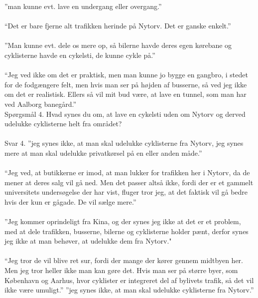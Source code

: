 \begin{appendics}
  ”man kunne evt. lave en undergang eller overgang.”
\\\\
  “Det er bare fjerne alt trafikken herinde på Nytorv. Det er ganske enkelt.”
\\\\
  ”Man kunne evt. dele os mere op, så bilerne havde deres egen kørebane og cyklisterne havde en cykelsti, de kunne cykle på.”
\\\\
  “Jeg ved ikke om det er praktisk, men man kunne jo bygge en gangbro, i stedet for de fodgængere felt, men hvis man ser på højden af busserne, så ved jeg ikke om det er realistisk. Ellers så vil mit bud være, at lave en tunnel, som man har ved Aalborg banegård.”
\\
Spørgsmål 4.
Hvad synes du om, at lave en cykelsti uden om Nytorv og derved udelukke cyklisterne helt fra området?
\\\\
  Svar 4.
  ”jeg synes ikke, at man skal udelukke cyklisterne fra Nytorv, jeg synes mere at man skal udelukke privatkørsel på en eller anden måde.”
\\\\
  “Jeg ved, at butikkerne er imod, at man lukker for trafikken her i Nytorv, da de mener at deres salg vil gå ned. Men det passer altså ikke, fordi der er et gammelt universitets undersøgelse der har vist, fluger tror jeg, at det faktisk vil gå bedre hvis der kun er gågade. De vil sælge mere.”
\\\\
  ”Jeg kommer oprindeligt fra Kina, og der synes jeg ikke at det er et problem, med at dele trafikken, busserne, bilerne og cyklisterne holder pænt, derfor synes jeg ikke at man behøver, at udelukke dem fra Nytorv."
\\\\
  “Jeg tror de vil blive ret sur, fordi der mange der kører gennem midtbyen her. Men jeg tror heller ikke man kan gøre det. Hvis man ser på større byer, som København og Aarhus, hvor cyklister er integreret del af bylivets trafik, så det vil ikke være umuligt.”
  ”jeg synes ikke, at man skal udelukke cyklisterne fra Nytorv.”
\\\\


\end{appendics}
